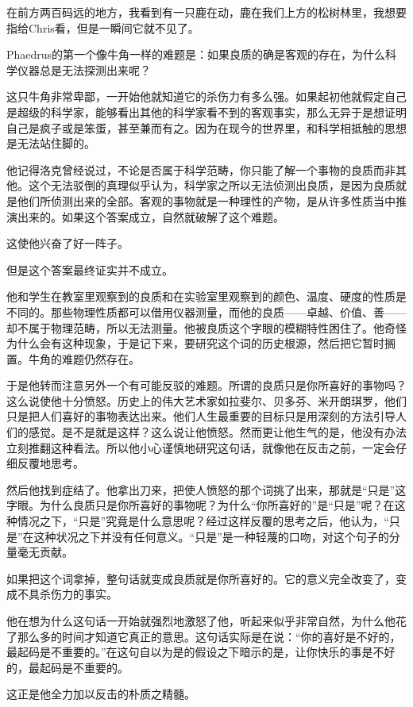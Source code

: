 \documentclass[UTF8]{article}
\begin{document}
\par 在前方两百码远的地方，我看到有一只鹿在动，鹿在我们上方的松树林里，我想要指给Chris看，但是一瞬间它就不见了。
\par Phaedrus的第一个像牛角一样的难题是：如果良质的确是客观的存在，为什么科学仪器总是无法探测出来呢？
\par 这只牛角非常卑鄙，一开始他就知道它的杀伤力有多么强。如果起初他就假定自己是超级的科学家，能够看出其他的科学家看不到的客观事实，那么无异于是想证明自己是疯子或是笨蛋，甚至兼而有之。因为在现今的世界里，和科学相抵触的思想是无法站住脚的。
\par 他记得洛克曾经说过，不论是否属于科学范畴，你只能了解一个事物的良质而非其他。这个无法驳倒的真理似乎认为，科学家之所以无法侦测出良质，是因为良质就是他们所侦测出来的全部。客观的事物就是一种理性的产物，是从许多性质当中推演出来的。如果这个答案成立，自然就破解了这个难题。
\par 这使他兴奋了好一阵子。
\par 但是这个答案最终证实并不成立。
\par 他和学生在教室里观察到的良质和在实验室里观察到的颜色、温度、硬度的性质是不同的。那些物理性质都可以借用仪器测量，而他的良质——卓越、价值、善——却不属于物理范畴，所以无法测量。他被良质这个字眼的模糊特性困住了。他奇怪为什么会有这种现象，于是记下来，要研究这个词的历史根源，然后把它暂时搁置。牛角的难题仍然存在。
\par 于是他转而注意另外一个有可能反驳的难题。所谓的良质只是你所喜好的事物吗？这么说使他十分愤怒。历史上的伟大艺术家如拉斐尔、贝多芬、米开朗琪罗，他们只是把人们喜好的事物表达出来。他们人生最重要的目标只是用深刻的方法引导人们的感觉。是不是就是这样？这么说让他愤怒。然而更让他生气的是，他没有办法立刻推翻这种看法。所以他小心谨慎地研究这句话，就像他在反击之前，一定会仔细反覆地思考。
\par 然后他找到症结了。他拿出刀来，把使人愤怒的那个词挑了出来，那就是“只是”这字眼。为什么良质只是你所喜好的事物呢？为什么“你所喜好的”是“只是”呢？在这种情况之下，“只是”究竟是什么意思呢？经过这样反覆的思考之后，他认为，“只是”在这种状况之下并没有任何意义。“只是”是一种轻蔑的口吻，对这个句子的分量毫无贡献。
\par 如果把这个词拿掉，整句话就变成良质就是你所喜好的。它的意义完全改变了，变成不具杀伤力的事实。
\par 他在想为什么这句话一开始就强烈地激怒了他，听起来似乎非常自然，为什么他花了那么多的时间才知道它真正的意思。这句话实际是在说：“你的喜好是不好的，最起码是不重要的。”在这句自以为是的假设之下暗示的是，让你快乐的事是不好的，最起码是不重要的。
\par 这正是他全力加以反击的朴质之精髓。
\end{document}
